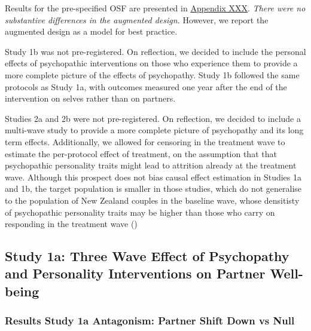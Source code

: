 \documentclass[
  single column]{article}
\begin{document}
Results for the pre-specified OSF are presented in
\href{appendix-XXX}{Appendix XXX}. \emph{There were no substantive
differences in the augmented design.} However, we report the augmented
design as a model for best practice.

Study 1b was not pre-registered. On reflection, we decided to include
the personal effects of psychopathic interventions on those who
experience them to provide a more complete picture of the effects of
psychopathy. Study 1b followed the same protocols as Study 1a, with
outcomes measured one year after the end of the intervention on selves
rather than on partners.

Studies 2a and 2b were not pre-registered. On reflection, we decided to
include a multi-wave study to provide a more complete picture of
psychopathy and its long term effects. Additionally, we allowed for
censoring in the treatment wave to estimate the per-protocol effect of
treatment, on the assumption that that psychopathic personality traits
might lead to attrition already at the treatment wave. Although this
prospect does not bias causal effect estimation in Studies 1a and 1b,
the target population is smaller in those studies, which do not
generalise to the population of New Zealand couples in the baseline
wave, whose densitisty of psychopathic personality traits may be higher
than those who carry on responding in the treatment wave
()

\subsection{Study 1a: Three Wave Effect of Psychopathy and Personality
Interventions on Partner
Well-being}\label{study-1a-three-wave-effect-of-psychopathy-and-personality-interventions-on-partner-well-being}

\subsubsection{Results Study 1a Antagonism: Partner Shift Down vs
Null}\label{results-study-1a-antagonism-partner-shift-down-vs-null}
\end{document}
